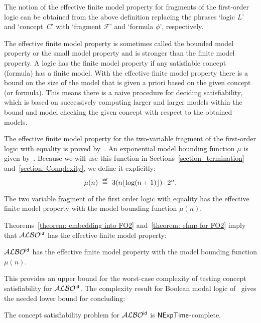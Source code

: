 \documentclass[leqno
,pdflatex
,prodmode
,acmtocl
]{acmsmall}
\makeatletter
\newcommand{\mathcmd}[1]{\ensuremath{#1}\xspace}
\newcommand{\dlfont}{\mathcal}
\newcommand{\dl}[1]{\mathcmd{\dlfont{#1}}}
\newcommand{\idRole}{\mathcmd{\textsf{\upshape\mdseries id}}}
\newcommand{\ALBOid}{\dl{ALBO\smash[t]{\mbox{${}^{\idRole}$}}}}
\newcommand{\metasmbfont}{\mathsf}
\def\@define#1{\mathcmd{\stackrel {\mbox{\tiny\ensuremath{\metasmbfont{def}}}}{{#1}}}}
\def\sm@shdefine#1{\smash[t]{\@define{#1}}}
\newcommand{\define}{\mathchoice{\@define{\ =\ }}{\sm@shdefine{=}}{\sm@shdefine{=}}{\sm@shdefine{=}}}
\def\complexityfont{\sffamily\upshape}
\def\complexity#1{\mathcmd{\text{\complexityfont #1}}}
\def\NExpTime{\complexity{NExpTime}}
\makeatother
\begin{document}
 The notion of the effective finite model property for 
 fragments of the first-order logic can be obtained
 from the above definition replacing the phrases `logic $L$'
 and `concept~$C$' with `fragment $\mathcal{F}$' and `formula $\phi$', respectively.

The effective finite model property is sometimes called
the bounded model property or the small model property
and is stronger than the finite
model property.
A logic has the finite model property if any satisfiable concept (formula) has
a finite model. 
With the effective finite model property there is a bound on the size
of the model that is given a priori based on the given concept (or formula).
This means there is a naive procedure for deciding satisfiability,
which is based on successively computing larger and larger models within
the bound and model checking the given concept with respect to the obtained models. 

The effective finite model property for the two-variable fragment 
of the first-order logic with equality is proved by~.
An exponential model bounding function $\mu$ is given
by~. 
Because we will use this function in Sections~\ref{section_termination} and~\ref{section: Complexity},
we define it explicitly:
\[\mu(n)\define3(n\lfloor\log(n+1)\rfloor)\cdot 2^n.\]

\begin{theorem}\label{theorem: efmp for FO2}
The two variable fragment of the first order logic with equality
has the effective finite model property with the model bounding
function $\mu(n)$.
\end{theorem}

Theorems~\ref{theorem: embedding into FO2} and~\ref{theorem: efmp for FO2}
imply that \ALBOid has the effective finite model property:
\begin{theorem}[Effective Finite Model Property of \ALBOid]\label{theorem: EFMP}
\ALBOid has the effective finite model property
with the model bounding function $\mu(n)$.
\end{theorem}
This provides an upper bound for the worst-case complexity of testing 
concept satisfiability
for \ALBOid. 
The complexity result for Boolean modal
logic of~ gives the needed lower bound for concluding:
\begin{theorem}
The concept satisfiability problem for \ALBOid is \NExpTime-complete.
\end{theorem}
\end{document}
